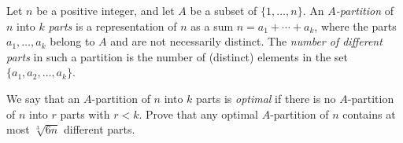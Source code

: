 Let $n$ be a positive integer, and let $A$ be a subset of $\{1, \ldots, n\}$. An \emph{$A$-partition} of $n$ into $k$ \emph{parts} is a representation of $n$ as a sum $n = a_1 + \cdots + a_k$, where the parts $a_1, \ldots, a_k$ belong to $A$ and are not necessarily distinct. The \emph{number of different parts} in such a partition is the number of (distinct) elements in the set $\{a_1, a_2, \ldots, a_k\}$.

We say that an $A$-partition of $n$ into $k$ parts is \emph{optimal} if there is no $A$-partition of $n$ into $r$ parts with $r < k$. Prove that any optimal $A$-partition of $n$ contains at most $\sqrt[3]{6n}$ different parts.
